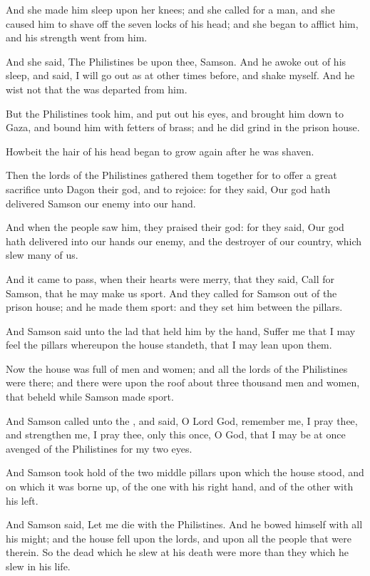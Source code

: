 \verse And she made him sleep upon her knees; and she called for a man, and she caused him to shave off the seven locks of his head; and she began to afflict him, and his strength went from him.

\verse And she said, The Philistines be upon thee, Samson. And he awoke out of his sleep, and said, I will go out as at other times before, and shake myself. And he wist not that the \LORD was departed from him.

\verse But the Philistines took him, and put out his eyes, and brought him down to Gaza, and bound him with fetters of brass; and he did grind in the prison house.

\verse Howbeit the hair of his head began to grow again after he was shaven.

\verse Then the lords of the Philistines gathered them together for to offer a great sacrifice unto Dagon their god, and to rejoice: for they said, Our god hath delivered Samson our enemy into our hand.

\verse And when the people saw him, they praised their god: for they said, Our god hath delivered into our hands our enemy, and the destroyer of our country, which slew many of us.

\verse And it came to pass, when their hearts were merry, that they said, Call for Samson, that he may make us sport. And they called for Samson out of the prison house; and he made them sport: and they set him between the pillars.

\verse And Samson said unto the lad that held him by the hand, Suffer me that I may feel the pillars whereupon the house standeth, that I may lean upon them.

\verse Now the house was full of men and women; and all the lords of the Philistines were there; and there were upon the roof about three thousand men and women, that beheld while Samson made sport.

\verse And Samson called unto the \LORD, and said, O Lord God, remember me, I pray thee, and strengthen me, I pray thee, only this once, O God, that I may be at once avenged of the Philistines for my two eyes.

\verse And Samson took hold of the two middle pillars upon which the house stood, and on which it was borne up, of the one with his right hand, and of the other with his left.

\verse And Samson said, Let me die with the Philistines. And he bowed himself with all his might; and the house fell upon the lords, and upon all the people that were therein. So the dead which he slew at his death were more than they which he slew in his life.

